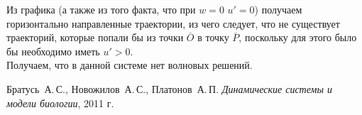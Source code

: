 \documentclass[oneside, final, 12pt]{article}
\begin{document}
Из графика (а также из того факта, что при \(w=0\)  \(u' = 0\)) получаем горизонтально направленные траектории, из чего следует, что не существует траекторий, которые попали бы из точки \(\overline{O}\) в точку \(\overline{P}\), поскольку для этого было бы необходимо иметь \(u' > 0\).\\

Получаем, что в данной системе нет волновых решений.


\newpage
\clearpage
\begin{thebibliography}{0}
	Братусь~А.\,С., Новожилов~А.\,С., Платонов~А.\,П. \label{Bratus_book}
	\emph{Динамические системы и модели биологии},
	2011 г.
\end{thebibliography}
\end{document}
